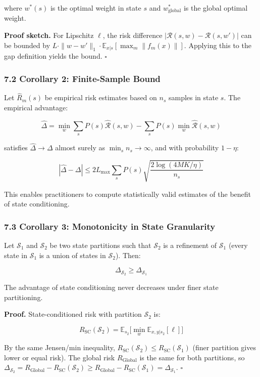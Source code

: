 \documentclass[
  12pt,
]{article}
\begin{document}
where \(w^*(s)\) is the optimal weight in state \(s\) and
\(w^*_{\text{global}}\) is the global optimal weight.

\textbf{Proof sketch.} For Lipschitz \(\ell\), the risk difference
\(|\mathcal{R}(s, w) - \mathcal{R}(s, w')|\) can be bounded by
\(L \cdot \|w - w'\|_1 \cdot \mathbb{E}_{x|s}[\max_m \|f_m(x)\|]\).
Applying this to the gap definition yields the bound. \(\square\)

\subsubsection{7.2 Corollary 2: Finite-Sample
Bound}\label{corollary-2-finite-sample-bound}

Let \(\hat{R}_m(s)\) be empirical risk estimates based on \(n_s\)
samples in state \(s\). The empirical advantage:

\[\hat{\Delta} = \min_{w} \sum_{s} P(s) \hat{\mathcal{R}}(s, w) - \sum_{s} P(s) \min_{w} \hat{\mathcal{R}}(s, w)\]

satisfies \(\hat{\Delta} \to \Delta\) almost surely as
\(\min_s n_s \to \infty\), and with probability \(1-\eta\):

\[|\hat{\Delta} - \Delta| \leq 2L_{\max} \sum_{s} P(s) \sqrt{\frac{2\log(4MK/\eta)}{n_s}}\]

This enables practitioners to compute statistically valid estimates of
the benefit of state conditioning.

\subsubsection{7.3 Corollary 3: Monotonicity in State
Granularity}\label{corollary-3-monotonicity-in-state-granularity}

Let \(\mathcal{S}_1\) and \(\mathcal{S}_2\) be two state partitions such
that \(\mathcal{S}_2\) is a refinement of \(\mathcal{S}_1\) (every state
in \(\mathcal{S}_1\) is a union of states in \(\mathcal{S}_2\)). Then:

\[\Delta_{\mathcal{S}_2} \geq \Delta_{\mathcal{S}_1}\]

The advantage of state conditioning never decreases under finer state
partitioning.

\textbf{Proof.} State-conditioned risk with partition \(\mathcal{S}_2\)
is:

\[R_{\text{SC}}(\mathcal{S}_2) = \mathbb{E}_{s_2}\bigl[\min_w \mathbb{E}_{x,y|s_2}[\ell]\bigr]\]

By the same Jensen/min inequality,
\(R_{\text{SC}}(\mathcal{S}_2) \leq R_{\text{SC}}(\mathcal{S}_1)\)
(finer partition gives lower or equal risk). The global risk
\(R_{\text{Global}}\) is the same for both partitions, so
\(\Delta_{\mathcal{S}_2} = R_{\text{Global}} - R_{\text{SC}}(\mathcal{S}_2) \geq R_{\text{Global}} - R_{\text{SC}}(\mathcal{S}_1) = \Delta_{\mathcal{S}_1}\).
\(\square\)
\end{document}
